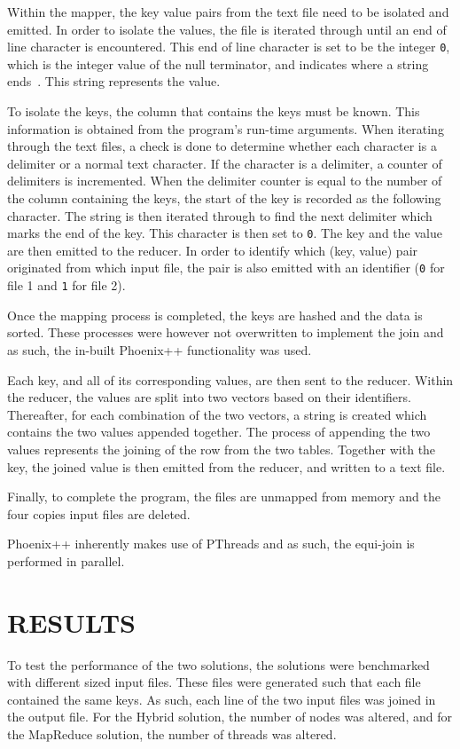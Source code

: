 \documentclass[12pt,twocolumn]{witseiepaper}
\begin{document}
Within the mapper, the key value pairs from the text file need to be isolated and emitted. In order to isolate the values, the file is iterated through until an end of line character is encountered. This end of line character is set to be the integer \texttt{0}, which is the integer value of the null terminator, and indicates where a string ends~\cite{phoenix}. This string represents the value.

To isolate the keys, the column that contains the keys must be known. This information is obtained from the program's run-time arguments. When iterating through the text files, a check is done to determine whether each character is a delimiter or a normal text character. If the character is a delimiter, a counter of delimiters is incremented. When the delimiter counter is equal to the number of the column containing the keys, the start of the key is recorded as the following character. The string is then iterated through to find the next delimiter which marks the end of the key. This character is then set to \texttt{0}. The key and the value are then emitted to the reducer. In order to identify which (key, value) pair originated from which input file, the pair is also emitted with an identifier (\texttt{0} for file 1 and \texttt{1} for file 2).

Once the mapping process is completed, the keys are hashed and the data is sorted. These processes were however not overwritten to implement the join and as such, the in-built Phoenix++ functionality was used.

Each key, and all of its corresponding values, are then sent to the reducer. Within the reducer, the values are split into two vectors based on their identifiers. Thereafter, for each combination of the two vectors, a string is created which contains the two values appended together. The process of appending the two values represents the joining of the row from the two tables. Together with the key, the joined value is then emitted from the reducer, and written to a text file.

Finally, to complete the program, the files are unmapped from memory and the four copies input files are deleted.

Phoenix++ inherently makes use of PThreads and as such, the equi-join is performed in parallel.

\section{RESULTS}
To test the performance of the two solutions, the solutions were benchmarked with different sized input files. These files were generated such that each file contained the same keys. As such, each line of the two input files was joined in the output file. For the Hybrid solution, the number of nodes was altered, and for the MapReduce solution, the number of threads was altered.
\end{document}
